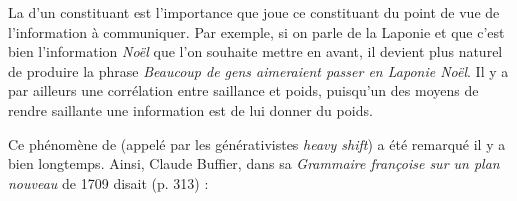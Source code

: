 La  d’un constituant est l’importance que joue ce constituant du point de vue de l’information à communiquer. Par exemple, si on parle de la Laponie et que c’est bien l’information \textit{Noël} que l’on souhaite mettre en avant, il devient plus naturel de produire la phrase \textit{Beaucoup de gens aimeraient passer en Laponie Noël}. Il y a par ailleurs une corrélation entre saillance et poids, puisqu’un des moyens de rendre saillante une information est de lui donner du poids.

Ce phénomène de  (appelé par les générativistes \textit{heavy shift}) a été remarqué il y a bien longtemps. Ainsi, Claude Buffier, dans sa \textit{Grammaire françoise sur un plan nouveau} de 1709 disait (p. 313) :

